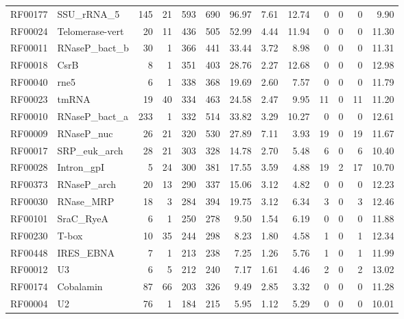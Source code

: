 \begin{table}
\begin{center}
\begin{tabular}{|ll|rr|rr|r|rr|rrrr|}
RF00177 & SSU\_rRNA\_5    &   145 &    21 &   593 & 690 &  96.97 &   7.61 &  12.74 &   0 &  0 &  0 &   9.90 \\
RF00024 & Telomerase-vert &    20 &    11 &   436 & 505 &  52.99 &   4.44 &  11.94 &   0 &  0 &  0 &  11.30 \\
RF00011 & RNaseP\_bact\_b &    30 &     1 &   366 & 441 &  33.44 &   3.72 &   8.98 &   0 &  0 &  0 &  11.31 \\
RF00018 & CsrB            &     8 &     1 &   351 & 403 &  28.76 &   2.27 &  12.68 &   0 &  0 &  0 &  12.98 \\
RF00040 & rne5            &     6 &     1 &   338 & 368 &  19.69 &   2.60 &   7.57 &   0 &  0 &  0 &  11.79 \\
RF00023 & tmRNA           &    19 &    40 &   334 & 463 &  24.58 &   2.47 &   9.95 &  11 &  0 & 11 &  11.20 \\
RF00010 & RNaseP\_bact\_a &   233 &     1 &   332 & 514 &  33.82 &   3.29 &  10.27 &   0 &  0 &  0 &  12.61 \\
RF00009 & RNaseP\_nuc     &    26 &    21 &   320 & 530 &  27.89 &   7.11 &   3.93 &  19 &  0 & 19 &  11.67 \\
RF00017 & SRP\_euk\_arch  &    28 &    21 &   303 & 328 &  14.78 &   2.70 &   5.48 &   6 &  0 &  6 &  10.40 \\
RF00028 & Intron\_gpI     &     5 &    24 &   300 & 381 &  17.55 &   3.59 &   4.88 &  19 &  2 & 17 &  10.70 \\
RF00373 & RNaseP\_arch    &    20 &    13 &   290 & 337 &  15.06 &   3.12 &   4.82 &   0 &  0 &  0 &  12.23 \\
RF00030 & RNase\_MRP      &    18 &     3 &   284 & 394 &  19.75 &   3.12 &   6.34 &   3 &  0 &  3 &  12.46 \\
RF00101 & SraC\_RyeA      &     6 &     1 &   250 & 278 &   9.50 &   1.54 &   6.19 &   0 &  0 &  0 &  11.88 \\
RF00230 & T-box           &    10 &    35 &   244 & 298 &   8.23 &   1.80 &   4.58 &   1 &  0 &  1 &  12.34 \\
RF00448 & IRES\_EBNA      &     7 &     1 &   213 & 238 &   7.25 &   1.26 &   5.76 &   1 &  0 &  1 &  11.99 \\
RF00012 & U3              &     6 &     5 &   212 & 240 &   7.17 &   1.61 &   4.46 &   2 &  0 &  2 &  13.02 \\
RF00174 & Cobalamin       &    87 &    66 &   203 & 326 &   9.49 &   2.85 &   3.32 &   0 &  0 &  0 &  11.28 \\
RF00004 & U2              &    76 &     1 &   184 & 215 &   5.95 &   1.12 &   5.29 &   0 &  0 &  0 &  10.01 \\

\end{tabular}
\end{center}
\end{table}

